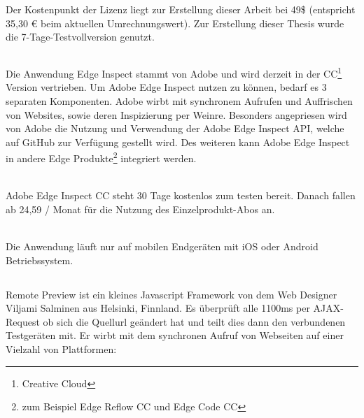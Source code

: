 	Der Kostenpunkt der Lizenz liegt zur Erstellung dieser Arbeit bei 49\$ (entspricht 35,30 € beim aktuellen Umrechnungswert). Zur 	Erstellung dieser Thesis wurde die 7-Tage-Testvollversion genutzt.
	
	\subsection{}
	Die Anwendung Edge Inspect stammt von Adobe und wird derzeit in der CC\footnote{Creative Cloud} Version vertrieben. Um 		Adobe Edge Inspect nutzen zu können, bedarf es 3 separaten Komponenten. Adobe wirbt mit synchronem Aufrufen und 			Auffrischen von Websites, sowie deren Inspizierung per Weinre. Besonders angepriesen wird von Adobe die Nutzung und 		Verwendung der Adobe Edge Inspect API, welche auf GitHub zur Verfügung gestellt wird. Des weiteren kann Adobe Edge 		Inspect in andere Edge Produkte\footnote{zum Beispiel Edge Reflow CC und Edge Code CC} integriert werden. 
	
	\\Adobe Edge Inspect CC steht 30 Tage kostenlos zum testen bereit. Danach fallen ab 24,59 / Monat für die Nutzung des 			Einzelprodukt-Abos an.
	
	\\Die Anwendung läuft nur auf mobilen Endgeräten mit iOS oder Android Betriebssystem.
	
	\subsection{}
	Remote Preview ist ein kleines Javascript Framework von dem Web Designer Viljami Salminen aus Helsinki, Finnland. Es 		überprüft alle 1100ms per AJAX-Request ob sich die Quellurl geändert hat und teilt dies dann den verbundenen Testgeräten mit. 	Er wirbt mit dem synchronen Aufruf von Webseiten auf einer Vielzahl von Plattformen: 
	
